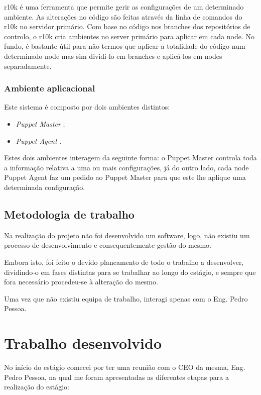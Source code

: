 \documentclass{article}
\begin{document}
r10k \cite{r10k} é uma ferramenta que permite gerir as configurações de um determinado ambiente. As alterações no código são feitas através da linha de comandos do r10k no servidor primário. Com base no código nos branches dos repositórios de controlo, o r10k cria ambientes no server primário para aplicar em cada node. No fundo, é bastante útil para não termos que aplicar a totalidade do código num determinado node mas sim dividi-lo em branches e aplicá-los em nodes separadamente.

\subsubsection{Ambiente aplicacional}
Este sistema é composto por dois ambientes distintos:

\begin{itemize}
    \item \textit{Puppet Master} \cite{puppet-master};
    \item \textit{Puppet Agent} \cite{puppet-agent}.
\end{itemize}

Estes dois ambientes interagem da seguinte forma: o Puppet Master \cite{puppet-master} controla toda a informação relativa a uma ou mais configurações, já do outro lado, cada node Puppet Agent \cite{puppet-agent} faz um pedido ao Puppet Master \cite{puppet-master} para que este lhe aplique uma determinada configuração.

\subsection{Metodologia de trabalho}
Na realização do projeto não foi desenvolvido um software, logo, não existiu um processo de desenvolvimento e consequentemente gestão do mesmo.

Embora isto, foi feito o devido planeamento de todo o trabalho a desenvolver, dividindo-o em fases distintas para se trabalhar ao longo do estágio, e sempre que fora necessário procedeu-se à alteração do mesmo.

Uma vez que não existiu equipa de trabalho, interagi apenas com o Eng. Pedro Pessoa. 

\cleardoublepage
\section{Trabalho desenvolvido}
No início do estágio comecei por ter uma reunião com o CEO da mesma, Eng. Pedro Pessoa, na qual me foram apresentadas as diferentes etapas para a realização do estágio:
\end{document}
